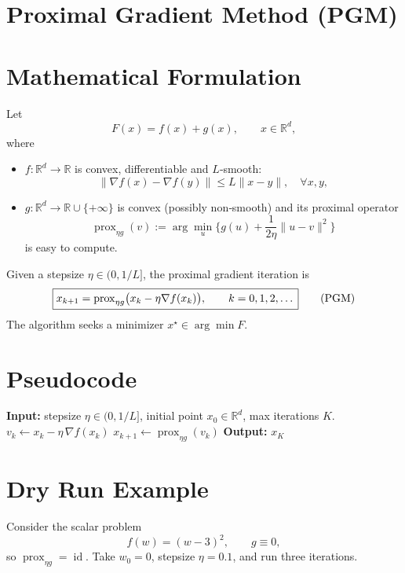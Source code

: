 \documentclass{article}
\newcommand{\prox}{\operatorname{prox}}
\newcommand{\grad}{\nabla}
\newcommand{\norm}[1]{\|#1\|}
\begin{document}
\section*{Proximal Gradient Method (PGM)}

\section*{Mathematical Formulation}
Let  
\[
F(x)=f(x)+g(x),\qquad x\in\mathbb R^{d},
\]
where  
\begin{itemize}
    \item $f:\mathbb R^{d}\to\mathbb R$ is convex, differentiable and $L$‑smooth:
    \[
    \norm{\grad f(x)-\grad f(y)}\le L\norm{x-y},\quad\forall x,y,
    \]
    \item $g:\mathbb R^{d}\to\mathbb R\cup\{+\infty\}$ is convex (possibly non‑smooth) and its proximal operator
    \[
    \prox_{\eta g}(v):=\arg\min_{u}\Big\{ g(u)+\frac{1}{2\eta}\norm{u-v}^{2}\Big\}
    \]
    is easy to compute.
\end{itemize}
Given a stepsize $\eta\in(0,1/L]$, the proximal gradient iteration is
\begin{equation}
\boxed{%
x_{k+1}= \prox_{\eta g}\bigl(x_{k}-\eta \grad f(x_{k})\bigr),\qquad k=0,1,2,\dots
}
\tag{PGM}
\end{equation}
The algorithm seeks a minimizer $x^{\star}\in\arg\min F$.

\section*{Pseudocode}
\begin{algorithm}[H]
\caption{Proximal Gradient Method}
\begin{algorithmic}[1]
\State \textbf{Input:} stepsize $\eta\in(0,1/L]$, initial point $x_{0}\in\mathbb R^{d}$, max iterations $K$.
    \State $v_{k}\gets x_{k}-\eta\,\grad f(x_{k})$ 
    \State $x_{k+1}\gets \prox_{\eta g}(v_{k})$ 
\EndFor
\State \textbf{Output:} $x_{K}$
\end{algorithmic}
\end{algorithm}

\section*{Dry Run Example}
Consider the scalar problem
\[
f(w)=(w-3)^{2},\qquad g\equiv0,
\]
so $\prox_{\eta g}= \operatorname{id}$.  
Take $w_{0}=0$, stepsize $\eta=0.1$, and run three iterations.
\end{document}
